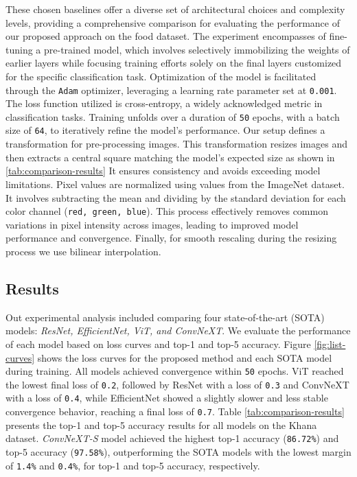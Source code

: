 \documentclass{article}
\begin{document}
These chosen baselines offer a diverse set of architectural choices and complexity levels, providing a comprehensive comparison for evaluating the performance of our proposed approach on the food dataset. The experiment encompasses of fine-tuning a pre-trained model, which involves selectively immobilizing the weights of earlier layers while focusing training efforts solely on the final layers customized for the specific classification task. Optimization of the model is facilitated through the \texttt{Adam} optimizer, leveraging a learning rate parameter set at \texttt{0.001}. The loss function utilized is cross-entropy, a widely acknowledged metric in classification tasks. Training unfolds over a duration of \texttt{50} epochs, with a batch size of \texttt{64}, to iteratively refine the model’s performance. Our setup defines a transformation for pre-processing images. This transformation resizes images and then extracts a central square matching the model’s expected size as shown in \ref{tab:comparison-results} It ensures consistency and avoids exceeding model limitations. Pixel values are normalized using values from the ImageNet dataset. It involves subtracting the mean and dividing by the standard deviation for each color channel (\texttt{red, green, blue}). This process effectively removes common variations in pixel intensity across images, leading to improved model performance and convergence. Finally, for smooth rescaling during the resizing process we use bilinear interpolation.

\subsection{Results}
\label{subsec:experi-results}

Out experimental analysis included comparing four state-of-the-art (SOTA) models: \textit{ResNet, EfficientNet, ViT, and ConvNeXT}. We evaluate the performance of each model based on loss curves and top-1 and top-5 accuracy. Figure \ref{fig:list-curves} shows the loss curves for the proposed method and each SOTA model during training. All models achieved convergence within \texttt{50} epochs. ViT reached the lowest final loss of \texttt{0.2}, followed by ResNet with a loss of \texttt{0.3} and ConvNeXT with a loss of \texttt{0.4}, while EfficientNet showed a slightly slower and less stable convergence behavior, reaching a final loss of \texttt{0.7}. Table \ref{tab:comparison-results} presents the top-1 and top-5 accuracy results for all models on the Khana dataset. \textit{ConvNeXT-S} model achieved the highest top-1 accuracy (\texttt{86.72\%}) and top-5 accuracy (\texttt{97.58\%}), outperforming the SOTA models with the lowest margin of \texttt{1.4\%} and \texttt{0.4\%}, for top-1 and top-5 accuracy, respectively.
\end{document}
